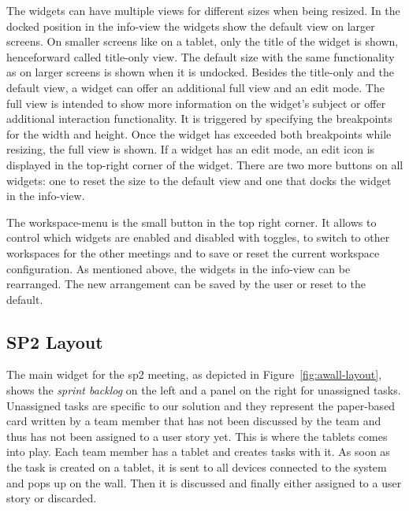 \documentclass{sigchi}
\begin{document}
The widgets can have multiple views for different sizes when being resized.
In the docked position in the info-view the widgets show the default view on larger screens. 
On smaller screens like on a tablet, only the title of the widget is shown, henceforward called title-only view.
The default size with the same functionality as on larger screens is shown when it is undocked.
Besides the title-only and the default view, a widget can offer an additional full view and an edit mode.
The full view is intended to show more information on the widget's subject or offer additional interaction functionality.
It is triggered by specifying the breakpoints for the width and height.
Once the widget has exceeded both breakpoints while resizing, the full view is shown.
If a widget has an edit mode, an edit icon is displayed in the top-right corner of the widget.
There are two more buttons on all widgets: one to reset the size to the default view and one that docks the widget in the info-view.


The workspace-menu is the small button in the top right corner.
It allows to control which widgets are enabled and disabled with toggles, to switch to other workspaces for the other meetings and to save or reset the current workspace configuration.
As mentioned above, the widgets in the info-view can be rearranged.
The new arrangement can be saved by the user or reset to the default.


\subsection{SP2 Layout}
The main widget for the \gls{sp2} meeting, as depicted in Figure~\ref{fig:awall-layout}, shows the \textit{sprint backlog} on the left and a panel on the right for unassigned tasks.
Unassigned tasks are specific to our solution and they represent the paper-based card written by a team member that has not been discussed by the team and thus has not been assigned to a user story yet.
This is where the tablets comes into play.
Each team member has a tablet and creates tasks with it.
As soon as the task is created on a tablet, it is sent to all devices connected to the system and pops up on the wall.
Then it is discussed and finally either assigned to a user story or discarded.
\end{document}
